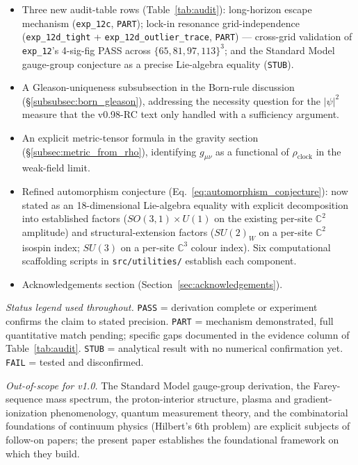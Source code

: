 \documentclass[12pt, letterpaper]{article}
\begin{document}
\begin{itemize}
\item Three new audit-table rows (Table~\ref{tab:audit}):
  long-horizon escape mechanism (\texttt{exp\_12c}, \texttt{PART});
  lock-in resonance grid-independence
  (\texttt{exp\_12d\_tight} + \texttt{exp\_12d\_outlier\_trace},
  \texttt{PART}) --- cross-grid validation of \texttt{exp\_12}'s
  4-sig-fig PASS across $\{65, 81, 97, 113\}^3$; and the Standard
  Model gauge-group conjecture as a precise Lie-algebra equality
  (\texttt{STUB}).
\item A Gleason-uniqueness subsubsection in the Born-rule
  discussion (§\ref{subsubsec:born_gleason}), addressing the
  necessity question for the $|\psi|^2$ measure that the
  v0.98-RC text only handled with a sufficiency argument.
\item An explicit metric-tensor formula in the gravity section
  (§\ref{subsec:metric_from_rho}), identifying $g_{\mu\nu}$ as a
  functional of $\rho_\text{clock}$ in the weak-field limit.
\item Refined automorphism conjecture
  (Eq.~\ref{eq:automorphism_conjecture}): now stated as an
  18-dimensional Lie-algebra equality with explicit decomposition
  into established factors ($SO(3,1) \times U(1)$ on the existing
  per-site $\mathbb{C}^2$ amplitude) and structural-extension
  factors ($SU(2)_W$ on a per-site $\mathbb{C}^2$ isospin index;
  $SU(3)$ on a per-site $\mathbb{C}^3$ colour index).  Six
  computational scaffolding scripts in \texttt{src/utilities/}
  establish each component.
\item Acknowledgements section
  (Section~\ref{sec:acknowledgements}).
\end{itemize}

\emph{Status legend used throughout.}  \texttt{PASS} = derivation
complete or experiment confirms the claim to stated precision.
\texttt{PART} = mechanism demonstrated, full quantitative match
pending; specific gaps documented in the evidence column of
Table~\ref{tab:audit}.  \texttt{STUB} = analytical result with no
numerical confirmation yet.  \texttt{FAIL} = tested and
disconfirmed.

\emph{Out-of-scope for v1.0.}  The Standard Model gauge-group
derivation, the Farey-sequence mass spectrum, the proton-interior
structure, plasma and gradient-ionization phenomenology, quantum
measurement theory, and the combinatorial foundations of
continuum physics (Hilbert's 6th problem) are explicit subjects
of follow-on papers; the present paper establishes the
foundational framework on which they build.
\end{document}
